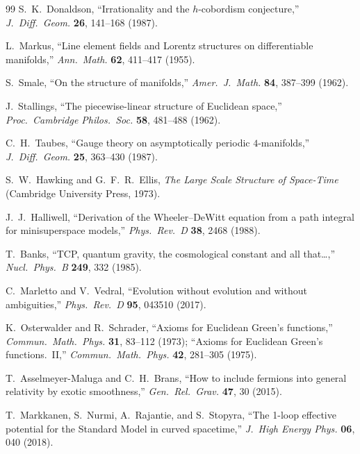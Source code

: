 \documentclass[12pt,a4paper]{article}
\theoremstyle{definition}
\theoremstyle{remark}
\begin{document}
\begin{thebibliography}{99}
S.~K.~Donaldson,
``Irrationality and the $h$-cobordism conjecture,''
\textit{J.\ Diff.\ Geom.} \textbf{26}, 141--168 (1987).

L.~Markus,
``Line element fields and Lorentz structures on differentiable manifolds,''
\textit{Ann.\ Math.} \textbf{62}, 411--417 (1955).

S.~Smale,
``On the structure of manifolds,''
\textit{Amer.\ J.\ Math.} \textbf{84}, 387--399 (1962).

J.~Stallings,
``The piecewise-linear structure of Euclidean space,''
\textit{Proc.\ Cambridge Philos.\ Soc.} \textbf{58}, 481--488 (1962).

C.~H.~Taubes,
``Gauge theory on asymptotically periodic $4$-manifolds,''
\textit{J.\ Diff.\ Geom.} \textbf{25}, 363--430 (1987).

S.~W.~Hawking and G.~F.~R.~Ellis,
\textit{The Large Scale Structure of Space-Time}
(Cambridge University Press, 1973).

J.~J.~Halliwell,
``Derivation of the Wheeler--DeWitt equation from a path integral for
minisuperspace models,''
\textit{Phys.\ Rev.\ D} \textbf{38}, 2468 (1988).

T.~Banks,
``TCP, quantum gravity, the cosmological constant and all that\ldots,''
\textit{Nucl.\ Phys.\ B} \textbf{249}, 332 (1985).

C.~Marletto and V.~Vedral,
``Evolution without evolution and without ambiguities,''
\textit{Phys.\ Rev.\ D} \textbf{95}, 043510 (2017).

K.~Osterwalder and R.~Schrader,
``Axioms for Euclidean Green's functions,''
\textit{Commun.\ Math.\ Phys.} \textbf{31}, 83--112 (1973);
``Axioms for Euclidean Green's functions.\ II,''
\textit{Commun.\ Math.\ Phys.} \textbf{42}, 281--305 (1975).

T.~Asselmeyer-Maluga and C.~H.~Brans,
``How to include fermions into general relativity by exotic smoothness,''
\textit{Gen.\ Rel.\ Grav.} \textbf{47}, 30 (2015).

T.~Markkanen, S.~Nurmi, A.~Rajantie, and S.~Stopyra,
``The 1-loop effective potential for the Standard Model in curved
spacetime,''
\textit{J.\ High Energy Phys.} \textbf{06}, 040 (2018).

\end{thebibliography}
\end{document}
